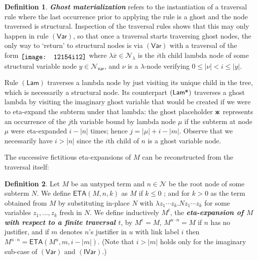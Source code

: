 \documentclass[xchauthor,chkrefs,GCNS,amsmath,amsthm,rotating,leaveRGB]{tcsg}
\renewcommand{\index}[1]{}
\theoremstyle{plain}
\theoremstyle{definition}
\newtheorem{definition}{Definition}[section]
\newcommand{\Nodes}{\mathcal{N}}
\newcommand{\NodesVar}{\Nodes_{\mathsf{var}}}
\newcommand{\NodesLmd}{\Nodes_\lambda}
\newcommand{\ghostvar}{\mathsf{x\mkern-5mu x}}
\begin{document}
\begin{definition}
{\textbf{\emph{Ghost materialization}}}\index{Ghost materialization} refers
to the instantiation of a traversal rule where the last occurrence prior to
applying the rule is a ghost and the node traversed is structural. Inspection
of the traversal rules shows that this may only happen in rule
$\mathsf{(Var)}$, so that once a traversal starts traversing ghost nodes, the
only way to `return' to structural nodes is via $\mathsf{(Var)}$ with a
traversal of the form $\raisebox{-2pt}{\texttt{[image: 12154i12]}}$ where $\lambda
\overline{x} \in \NodesLmd $ is the $i$th child lambda node of some
structural variable node $y \in \NodesVar $, and $\nu $ is a $\lambda $-node
verifying $0\leq |\nu | < i \leq |y|$.
\end{definition}

Rule $\mathsf{(Lam)}$ traverses a lambda node by just visiting its unique
child  in the tree, which is necessarily a structural node. Its counterpart
$\mathsf{(Lam^{\ghostvar}  )}$ traverses a ghost lambda by visiting the
imaginary ghost variable that would be created if we were to eta-expand the
subterm under that lambda: the ghost placeholder $\ghostvar $ represents an
occurrence of the $j$th variable bound by lambda node $\mu $ if the subterm
at node $\mu $ were eta-expanded $i-|n|$ times; hence $j = |\mu | + i - |m|$.
Observe that we necessarily have $i>|n|$ since the $i$th child of $n$ is a
ghost variable node.

The successive fictitious eta-expansions of $M$ can be reconstructed from the
traversal itself:

\begin{definition}\label{def:onthefly_etaexpansion}
Let $M$ be an untyped term and $n\in \Nodes $ be the root node of some
subterm $N$. We define $\mathsf{ETA}(M, n, k)$ as $M$ if $k \leq 0$ ; and for
$k> 0$ as the term obtained from $M$ by substituting in-place $N$ with
$\lambda z_{1} \cdots z_{k}. N z_{1} \cdots z_{k}$ for some variables $z_{1},
\ldots , z_{k}$ fresh in $N$. We define inductively $M^{t}$,  the
\textbf{\emph{eta-expansion of $M$ with respect to a finite traversal
$t$}}\index{eta-expansion of $M$ with respect to a finite traversal $t$}, by
$M^\epsilon = M$, $M^{u \cdot n} = M$ if $n$ has no justifier, and if $m$
denotes $n$'s justifier in $u$ with link label $i$ then $M^{u \cdot n} =
\mathsf{ETA}(M^{u}, m, i-|m|)$. (Note that $i>|m|$ holds only for the
imaginary sub-case of $\mathsf{(Var)}$ and $\mathsf{(IVar)}$.)
\end{definition}
\end{document}
